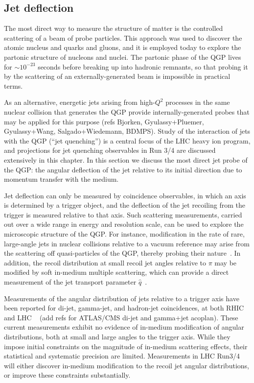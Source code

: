 \subsection{Jet deflection}
The most direct way to measure the structure of matter is the controlled scattering of a beam of probe particles. This approach was used to discover the atomic nucleus and quarks and gluons, and it is employed today to explore the partonic structure of nucleons and nuclei. The partonic phase of the QGP lives for $\sim10^{-23}$ seconds before breaking up into hadronic remnants, so that probing it by the scattering of an externally-generated beam is impossible in practical terms. 

As an alternative, energetic jets arising from high-$Q^2$ processes in the same nuclear collision that generates the QGP provide internally-generated probes that may be applied for this purpose (refs Bjorken, Gyulassy+Pluemer, Gyulassy+Wang, Salgado+Wiedemann, BDMPS). Study of the interaction of jets with the QGP (``jet quenching'') is a central focus of the LHC heavy ion program, and projections for jet quenching observables in Run 3/4 are discussed extensively in this chapter. In this section we discuss the most direct jet probe of the QGP: the angular deflection of the jet relative to its initial direction due to momentum transfer with the medium. 

Jet deflection can only be measured by coincidence observables, in which an axis is determined by a trigger object, and the deflection of the jet recoiling from the trigger is measured relative to that axis. Such scattering measurements, carried out over a wide range in energy and resolution scale, can be used to explore the microscopic structure of the QGP. For instance, modification in the rate of rare, large-angle jets in nuclear collisions relative to a vacuum reference may arise from the scattering off quasi-particles of the QGP, thereby probing their nature~\cite{DEramo:2012uzl}. In addition, the recoil distribution at small recoil jet angles relative to $\pi$ may be modified by soft in-medium multiple scattering, which can provide a direct measurement of the jet transport parameter $\hat{q}$~\cite{Chen:2016vem}.

Measurements of the angular distribution of jets relative to a trigger axis have been reported for di-jet, gamma-jet, and hadron-jet coincidences, at both RHIC~\cite{Adamczyk:2017yhe} and LHC ~\cite{Adam:2015doa} (add refs for ATLAS/CMS di-jet and gamma+jet acoplan). These current measurements exhibit no evidence of in-medium modification of angular distributions, both at small and large angles to the trigger axis. While they impose initial constraints on the magnitude of in-medium scattering effects, their statistical and systematic precision are limited. Measurements in LHC Run3/4 will either discover in-medium modification to the recoil jet angular distributions, or improve these constraints substantially.

